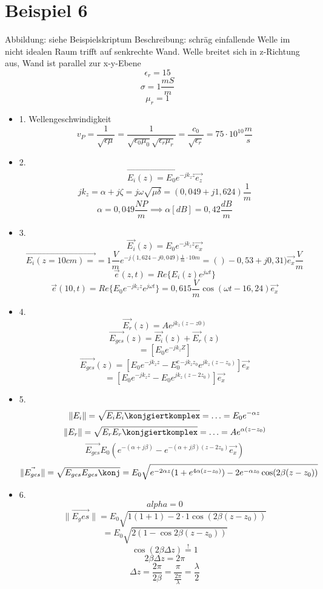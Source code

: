 \documentclass[a4paper]{article}
\begin{document}
\section*{Beispiel 6}
Abbildung: siehe Beispielskriptum
Beschreibung: schräg einfallende Welle im nicht idealen Raum trifft auf senkrechte Wand.
Welle breitet sich in z-Richtung aus, Wand ist parallel zur x-y-Ebene
\[  \epsilon_{r}=15 \]
\[ \sigma=1 \frac{mS}{m} \]
\[ \mu_{r}=1 \]
\begin{itemize}
    \item 1. Wellengeschwindigkeit
        \[ v_{P}=\frac{1}{\sqrt{\epsilon\mu}}=\frac{1}{\sqrt{\epsilon_{0}\mu_{0}} \sqrt{\epsilon_{r}\mu_{r}} }=\frac{c_{0}}{\sqrt{\epsilon_{r}} } =75\cdot 10^{10}\frac{m}{s}\]

    \item 2.
        \[ \vec{E_{i}(z)=E_{0}e^{-jk_{z}z}}\vec{e_{z}} \]
        \[ jk_{z}=\alpha+j\zeta=j\omega\sqrt{\mu\delta} =(0,049+j1,624)\frac{1}{m} \]
        \[ \alpha=0,049  \frac{NP}{m} \implies \alpha[dB]=0,42 \frac{dB}{m} \]

    \item 3. 
        \[ \vec{E_{i}}(z)=E_{0}e^{-jk_{z}z}\vec{e_{x}} \]
        \[ \vec{E_{i}(z=10cm)=}=1 \frac{V}{m}e^{-j(1,624-j0,049)\frac{1}{m}\cdot 10m}=()-0,53+j0,31)\vec{e_{x}}\frac{V}{m}\]
        \[ \vec{e}(z,t)=Re\{E_{i}(z)e^{j\omega t}\} \]
        \[ \vec{e}(10,t)=Re\{E_{0}e^{-jk_{z}z}e^{j\omega t}\} = 0,615 \frac{V}{m}\cos(\omega t - 16,24)\vec{e_{x}}\]

    \item 4.
        \[ \vec{E_{r}}(z)=Ae^{jk_{z}(z-z0)} \]
        \[ \vec{E_{ges}}(z)=\vec{E_{i}}(z)+\vec{E_{r}}(z) \]
        \[ =[E_{0}e^{-jk_{z}Z}] \]
        \[ \vec{E_{ges}}(z)=[E_{0}e^{-jk_{z}z}-E_{0}^e^{-jk_{z}z_{0}}e^{jk_{z}(z-z_0)}] \vec{e_{x}}\]
        \[ =[E_{0}e^{-jk_{z}z}-E_{0}e^{jk_{z}(z-2z_0)}]\vec{e_{x}} \]
        
    \item 5.
        \[ \|E_{i}\|=\sqrt{E_{i}E_{i}\konjgiertkomplex}=\ldots=E_{0}e^{-\alpha z}\]
        \[ \|E_{r}\|=\sqrt{E_{r}E_{r}\konjgiertkomplex}=\ldots=Ae^{\alpha(z-z_{0})} \]
        \[ \vec{E_{ges}}E_{0}(e^{-(\alpha+j\beta)}-e^{-(\alpha+j\beta)(z-2z_{0})}\vec{e_{x}}) \]
        \[ \|\vec{E_{ges}}\|=\sqrt{E_{ges}E_{ges}\konj}=E_{0}\sqrt{e^{-2\alpha z}(1+e^{4\alpha (z-z_{0})})-2e^{-\alpha z_{0}}\cos(2\beta(z-z_{0}))}  \]

    \item 6.
        \[ alpha = 0 \]
        \[ \|\vec{E_ges}\|=E_{0}\sqrt{1(1+1)-2\cdot 1\cos(2\beta(z-z_{0}))} \]
        \[ =E_{0}\sqrt{2(1-\cos2\beta(z-z_{0}))}  \]
        \[\cos(2\beta\Delta z)\overset{!}{=}1 \]
        \[ 2\beta\Delta z = 2\pi \]
        \[ \Delta z =\frac{2\pi}{2\beta}=\frac{\pi}{\frac{2\pi}{\lambda}}=\frac{\lambda}{2}\]
\end{itemize}
\end{document}
